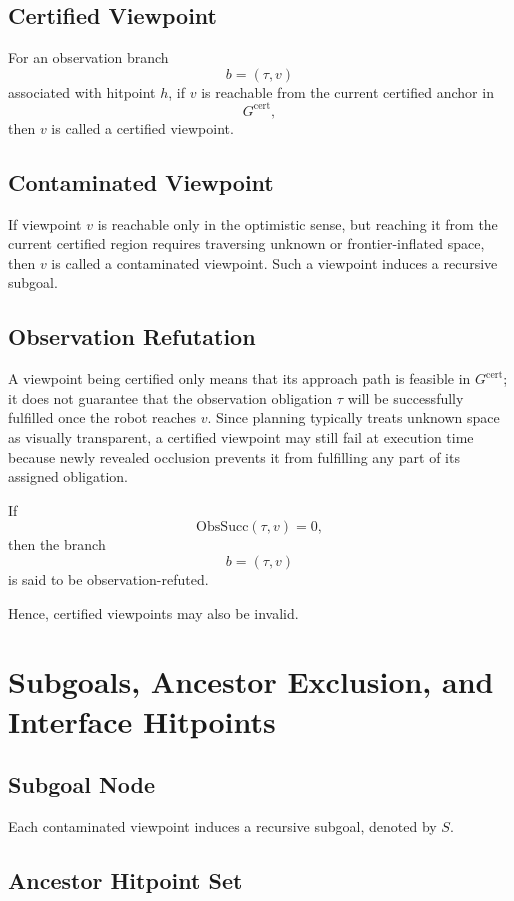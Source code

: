 \documentclass[11pt]{article}
\begin{document}
\subsection{Certified Viewpoint}

For an observation branch
\[
b=(\tau,v)
\]
associated with hitpoint $h$, if $v$ is reachable from the current certified anchor in
\[
G^{\mathrm{cert}},
\]
then $v$ is called a certified viewpoint.

\subsection{Contaminated Viewpoint}

If viewpoint $v$ is reachable only in the optimistic sense, but reaching it from the current certified region requires traversing unknown or frontier-inflated space, then $v$ is called a contaminated viewpoint. Such a viewpoint induces a recursive subgoal.

\subsection{Observation Refutation}

A viewpoint being certified only means that its approach path is feasible in $G^{\mathrm{cert}}$; it does not guarantee that the observation obligation $\tau$ will be successfully fulfilled once the robot reaches $v$. Since planning typically treats unknown space as visually transparent, a certified viewpoint may still fail at execution time because newly revealed occlusion prevents it from fulfilling any part of its assigned obligation.

If
\[
\mathrm{ObsSucc}(\tau,v)=0,
\]
then the branch
\[
b=(\tau,v)
\]
is said to be observation-refuted.

Hence, certified viewpoints may also be invalid.

\section{Subgoals, Ancestor Exclusion, and Interface Hitpoints}

\subsection{Subgoal Node}

Each contaminated viewpoint induces a recursive subgoal, denoted by $S$.

\subsection{Ancestor Hitpoint Set}
\end{document}
